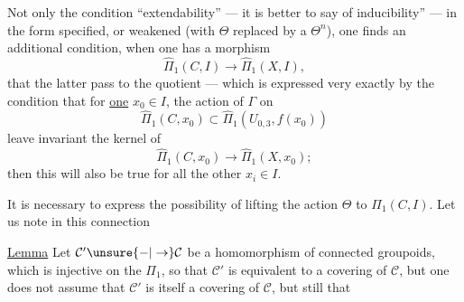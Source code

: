 Not only the condition   ``extendability'' --- it is better to say of inducibility'' --- in the form specified, or weakened (with $\Theta$ replaced by a $\Theta^n$), one finds an additional condition, when one has  a morphism
\[
\widehat\Pi_1(C,I)\longrightarrow\widehat\Pi_1(X,I),
\]
that the latter pass to the quotient --- which is expressed very exactly by the condition that for \uline{one} $x_0\in I$, the action of $\Gamma$ on
\[
\widehat\Pi_1(C,x_0)\subset\widehat\Pi_1(U_{0,3},f(x_0))
\]
leave invariant the kernel of
\[
\widehat\Pi_1(C,x_0)\longrightarrow\widehat\Pi_1(X,x_0);
\]
then this will also be true for all the other $x_i\in I$.

It is necessary to express the possibility of lifting the action  $\Theta$ to $\Pi_1(C,I)$. Let us note in this connection

\uline{Lemma} Let $\mathcal C'\unsure{\mathbin{-}|\to}\mathcal C$ be a homomorphism of connected groupoids, which is injective on the $\Pi_1$,  so that $\mathcal C'$ is equivalent to a covering of $\mathcal C$, but one does not assume that $\mathcal C'$ is itself a covering of $\mathcal C$, but still that
